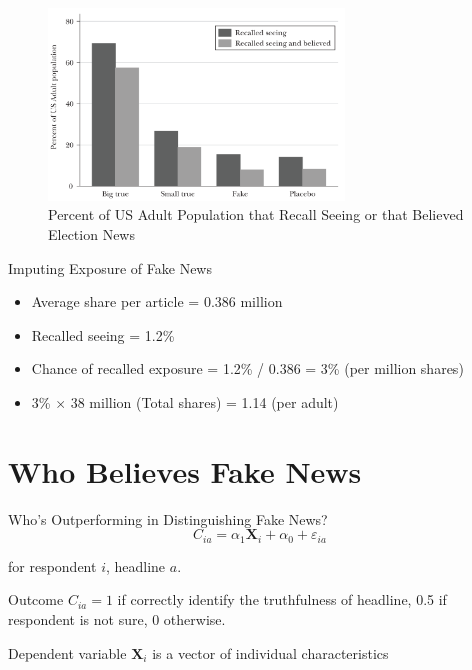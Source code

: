 \documentclass[
  10pt,
  ignorenonframetext,
  aspectratio=43,
]{beamer}
\providecommand{\tightlist}{%
  \setlength{\itemsep}{0pt}\setlength{\parskip}{0pt}}
\begin{document}
\begin{frame}
\begin{figure}
\centering
\includegraphics[width=0.7\textwidth,height=\textheight]{20220315-allcott-gentzkow-2016-election-fake-news.assets/image-20220314204225668.png}
\caption{Percent of US Adult Population that Recall Seeing or that
Believed Election News}
\end{figure}

\end{frame}

\begin{frame}
\begin{block}{Imputing Exposure of Fake News}
\protect\hypertarget{imputing-exposure-of-fake-news}{}
\begin{itemize}
\tightlist
\item
  Average share per article = 0.386 million
\item
  Recalled seeing = 1.2\%
\item
  Chance of recalled exposure = 1.2\% / 0.386 = 3\% (per million shares)
\item
  3\% \(\times\) 38 million (Total shares) = 1.14 (per adult)
\end{itemize}
\end{block}
\end{frame}

\hypertarget{who-believes-fake-news}{%
\section{Who Believes Fake News}\label{who-believes-fake-news}}

\begin{frame}{Who's Outperforming in Distinguishing Fake News?}
\protect\hypertarget{whos-outperforming-in-distinguishing-fake-news}{}
\[
C_{i a} = \alpha_{1} \mathbf{X}_{i}+\alpha_{0}+\varepsilon_{i a}
\]

for respondent \(i\), headline \(a\).

Outcome \(C_{i a} = 1\) if correctly identify the truthfulness of
headline, 0.5 if respondent is not sure, 0 otherwise.

Dependent variable \(\mathbf{X}_i\) is a vector of individual
characteristics
\end{frame}
\end{document}

